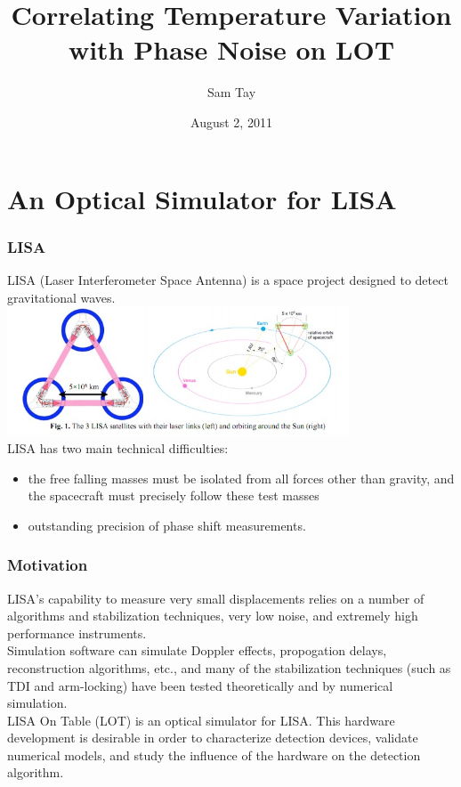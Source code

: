 \documentclass[notes, compressed, blue]{beamer}
\title{Correlating Temperature Variation with Phase Noise on LOT}
\author{Sam Tay}
\institute{Astroparticule et Cosmologie}
\date{August 2, 2011}
\begin{document}
\begin{frame}
  \titlepage
\end{frame}



\section{An Optical Simulator for LISA}

\begin{frame}
\frametitle{LISA}

LISA (Laser Interferometer Space Antenna) is a space project designed to detect gravitational waves.\\
\hspace{.5cm}\includegraphics[width=4in]{figure1.jpg}\\
LISA has two main technical difficulties:
\begin{itemize}
\item the free falling masses must be isolated from all forces other than gravity, and the spacecraft must precisely follow these test masses
\item outstanding precision of phase shift measurements.
\end{itemize}
\end{frame}



\begin{frame}
\frametitle{Motivation}

LISA's capability to measure very small displacements relies on a number of algorithms and stabilization techniques, very low noise, and extremely high performance instruments.\\
\vspace{.3cm}
Simulation software can simulate Doppler effects, propogation delays, reconstruction algorithms, etc., and many of the stabilization techniques (such as TDI and arm-locking) have been tested theoretically and by numerical simulation.\\
\vspace{.3cm}
LISA On Table (LOT) is an optical simulator for LISA. This hardware development is desirable in order to characterize detection devices, validate numerical models, and study the influence of the hardware on the detection algorithm.

\end{frame}
\end{document}
